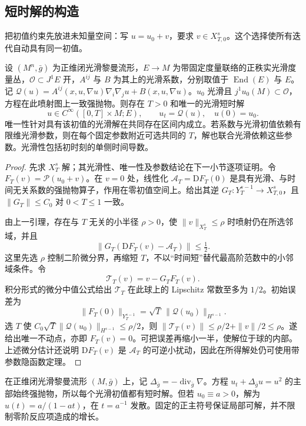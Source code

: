 \subsection{短时解的构造}
\label{g3:subsec:2602:02}
把初值约束先放进未知量空间：写 \(u=u_0+v\)，要求 \(v\in X_{T,0}^s\)。这个选择使所有迭代自动具有同一初值。

\begin{theorem}\label{g3:thm:quasilinear-parabolic-short-time}
	设 \((M^n,\bar g)\) 为正维闭光滑黎曼流形，\(E\to M\) 为带固定度量联络的正秩实光滑度量丛，\(\mathcal O\subset J^1E\) 开，\(A^{ij}\) 与 \(B\) 为其上的光滑系数，分别取值于 \(\operatorname{End}(E)\) 与 \(E\)。记 \(\mathcal Q(u)=A^{ij}(x,u,\nabla u)\nabla_i\nabla_ju+B(x,u,\nabla u)\)。\(u_0\) 光滑且 \(j^1u_0(M)\subset\mathcal O\)，方程在此喷射图上一致强抛物。则存在 \(T>0\) 和唯一的光滑短时解
	\[
		u\in C^\infty([0,T]\times M;E),\qquad
		u_t=\mathcal Q(u),\quad u(0)=u_0.
	\]
	唯一性针对具有该初值的光滑解在共同存在区间内成立。若系数与光滑初值依赖有限维光滑参数，则在每个固定参数附近可选共同的 \(T\)，解也联合光滑依赖这些参数。光滑性包括初时刻的单侧时间导数。
\end{theorem}
\begin{proof}
	先求 \(X_T^s\) 解；其光滑性、唯一性及参数结论在下一小节逐项证明。令 \(F_T(v)=\mathscr P(u_0+v)\)。在 \(v=0\) 处，线性化 \(\mathcal A_T=\mathrm DF_T(0)\) 是具有光滑、与时间无关系数的强抛物算子，作用在零初值空间上。给出其逆 \(G_T:Y_T^{s-1}\to X_{T,0}^s\)，且 \(\|G_T\|\le C_0\) 对 \(0<T\le1\) 一致。

	由上一引理，存在与 \(T\) 无关的小半径 \(\rho>0\)，使 \(\|v\|_{X_T^s}\le\rho\) 时喷射仍在所选邻域，并且
	\[
		\|G_T(\mathrm DF_T(v)-\mathcal A_T)\|\le\tfrac12.
	\]
	这里先选 \(\rho\) 控制二阶微分界，再缩短 \(T\)，不以“时间短”替代最高阶范数中的小邻域条件。令
	\[
		\mathcal T_T(v)=v-G_TF_T(v).
	\]
	积分形式的微分中值公式给出 \(\mathcal T_T\) 在此球上的 Lipschitz 常数至多为 \(1/2\)。初始误差为
	\[
		\|F_T(0)\|_{Y_T^{s-1}}
		=\sqrt T\,\|\mathcal Q(u_0)\|_{H^{s-1}}.
	\]
	选 \(T\) 使 \(C_0\sqrt T\|\mathcal Q(u_0)\|_{H^{s-1}}\le\rho/2\)，则
	\(\|\mathcal T_T(v)\|\le\rho/2+\|v\|/2\le\rho\)。遂给出唯一不动点，亦即 \(F_T(v)=0\)。可把误差再缩小一半，使解位于球的内部。上述微分估计还说明 \(\mathrm DF_T(v)\) 是 \(\mathcal A_T\) 的可逆小扰动，因此在所得解处仍可使用带参数隐函数定理。
\end{proof}

\begin{example}\label{g3:exm:reaction-diffusion-short-time}
	在正维闭光滑黎曼流形 \((M,\bar g)\) 上，记 \(\Delta_{\bar g}=-\operatorname{div}_{\bar g}\nabla\)。方程 \(u_t+\Delta_{\bar g}u=u^2\) 的主部始终强抛物，所以每个光滑初值都有短时解。但若 \(u_0\equiv a>0\)，解为 \(u(t)=a/(1-at)\)，在 \(t=a^{-1}\) 发散。固定的正主符号保证局部可解，并不限制零阶反应项造成的增长。
\end{example}

